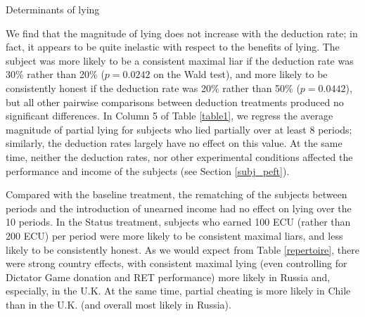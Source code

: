 \documentclass[12pt]{article}
\begin{document}
\begin{table}[ht]
\begin{center}
\tiny

\end{center}
\caption{Determinants of lying}
\label{table1}
\end{table}

\par We find that the magnitude of lying does not increase with the deduction rate; in fact, it appears to be quite inelastic with respect to the benefits of lying. The subject was more likely to be a consistent maximal liar if the deduction rate was 30\% rather than 20\% ($p=0.0242$ on the Wald test), and more likely to be consistently honest if the deduction rate was 20\% rather than 50\% ($p=0.0442$), but all other pairwise comparisons between 
deduction treatments produced no significant differences.\footnotemark{}
In Column 5 of Table \ref{table1}, we regress the average magnitude of partial lying for subjects who lied partially over at least 8 periods; similarly, the deduction rates largely have no effect on this value. At the same time, neither the deduction rates, nor other experimental conditions affected the performance and income of the subjects (see Section \ref{subj_peft}).  

\par Compared with the baseline treatment, the rematching of the subjects between periods and the introduction of unearned income had no effect on lying over the 10 periods. In the Status treatment, subjects who earned 100 ECU (rather than 200 ECU) per period were more likely to be consistent maximal liars, and less likely to be consistently honest.   
As we would expect from Table \ref{repertoire}, there were strong country effects, with consistent maximal lying (even controlling for Dictator Game donation and RET performance) more likely in Russia and, especially, in the U.K. At the same time, partial cheating is more likely in Chile than in the U.K. (and overall most likely in Russia). 



 
\end{document}
